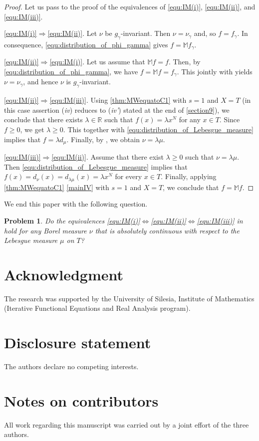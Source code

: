 \documentclass{amsart}
\theoremstyle{plain}%
\newtheorem{problem}[theorem]{Problem}
\theoremstyle{definition}
\theoremstyle{remark}
\begin{document}
\begin{proof}
Let us pass to the proof of the equivalences of \ref{equ:IM(i)}, \ref{equ:IM(ii)}, and \ref{equ:IM(iii)}.

\ref{equ:IM(i)}$\Rightarrow$\ref{equ:IM(ii)}.  Let $\nu$ be $g_\gamma$-invariant. Then  $\nu=\nu_\gamma$ and, so $f=f_\gamma$. In consequence,  \eqref{equ:distribution_of_phi_gamma} gives	$f=\mathbb{M} f_\gamma$.

\ref{equ:IM(ii)}$\Rightarrow$\ref{equ:IM(i)}.  Let us assume that $\mathbb{M}f=f$. Then, by \eqref{equ:distribution_of_phi_gamma}, we have $f=\mathbb{M} f=f_\gamma$. This jointly with  yields $\nu=\nu_\gamma$, and hence
$\nu$ is $g_\gamma$-invariant.

\ref{equ:IM(ii)}$\Rightarrow$\ref{equ:IM(iii)}. Using \cref{thm:MWequatoC1} with $s=1$ and $X=T$ (in this case assertion (\textit{iv}) reduces to (\textit{iv'}) stated at the end of \cref{section9}), we conclude that there exists $\lambda\in \mathbb{R}$ such that $f(x)=\lambda x^N$ for any $x\in T$. Since $f\ge 0$, we get $\lambda\ge 0$. This together with \eqref{equ:distribution_of_Lebesgue_measure} implies that $f=\lambda d_\mu$. Finally, by , we obtain  $\nu=\lambda\mu$.

\ref{equ:IM(iii)}$\Rightarrow$\ref{equ:IM(ii)}. Assume that there exist $\lambda\ge 0$ such that $\nu=\lambda\mu$. Then \eqref{equ:distribution_of_Lebesgue_measure} implies that $f(x)=d_\nu(x)=d_{\lambda\mu}(x)=\lambda x^N$ for every $x\in T$. Finally, applying  \cref{thm:MWequatoC1} \ref{mainIV} with $s=1$ and $X=T$, we conclude that $f=\mathbb{M}f$.
\end{proof}

We end this paper with the following question.

\begin{problem}
Do the equivalences \ref{equ:IM(i)}$\Leftrightarrow$\ref{equ:IM(ii)}$\Leftrightarrow$\ref{equ:IM(iii)} in  hold for any Borel measure $\nu$ that is absolutely continuous with respect to the Lebesgue measure $\mu$ on $T$?
\end{problem}


\section*{Acknowledgment}
The research was supported by the University of Silesia, Institute of Mathematics (Iterative Functional Equations and Real Analysis program).

\section*{Disclosure statement}
The authors declare no competing interests.

\section*{Notes on contributors} 
All work regarding this manuscript was carried out by a joint effort of the three authors.


%
%

\end{document}
